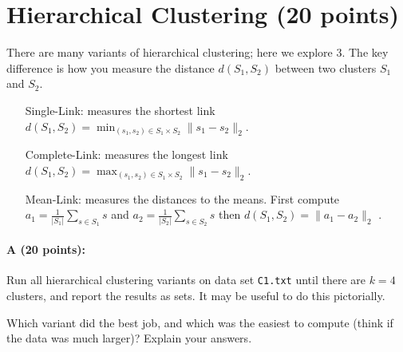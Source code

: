 \documentclass[11pt]{article}
\begin{document}
\section{Hierarchical Clustering (20 points)}

There are many variants of hierarchical clustering; here we explore $3$.  The key difference is how you measure the distance $d(S_1, S_2)$ between two clusters $S_1$ and $S_2$.  
\begin{itemize}
\item[\textsf{Single-Link: }] measures the shortest link $\displaystyle{d(S_1,S_2) = \min_{(s_1,s_2) \in S_1 \times S_2} \|s_1 - s_2\|_2}$. 

\item[\textsf{Complete-Link: }] measures the longest link $\displaystyle{d(S_1,S_2) = \max_{(s_1,s_2) \in S_1 \times S_2} \|s_1 - s_2\|_2}$. 

\item[\textsf{Mean-Link: }] measures the distances to the means.  First compute 
$a_1 = \frac{1}{|S_1|} \sum_{s \in S_1} s$ and 
$a_2 = \frac{1}{|S_2|} \sum_{s \in S_2} s$ then
$\displaystyle{d(S_1, S_2) = \|a_1 - a_2\|_2}$ .
\end{itemize}

\paragraph{A (20 points):}  
Run all hierarchical clustering variants on data set \texttt{C1.txt} until there are $k=4$ clusters, and report the results as sets.  
It may be useful to do this pictorially.  

Which variant did the best job, and which was the easiest to compute (think if the data was much larger)?  
Explain your answers.  
\end{document}
